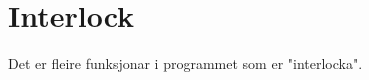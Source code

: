 \section{Interlock}
\thispagestyle{fancy}

Det er fleire funksjonar i programmet som er "interlocka".